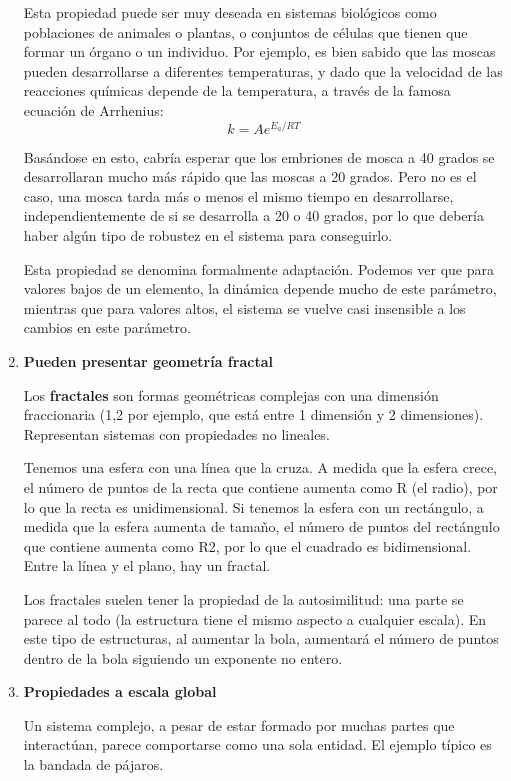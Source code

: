 \begin{enumerate}
Esta propiedad puede ser muy deseada en sistemas biológicos como poblaciones de animales o plantas, o conjuntos de células que tienen que formar un órgano o un individuo. Por ejemplo, es bien sabido que las moscas pueden desarrollarse a diferentes temperaturas, y dado que la velocidad de las reacciones químicas depende de la temperatura, a través de la famosa ecuación de Arrhenius:
$$k = Ae^{E_a/RT}$$

Basándose en esto, cabría esperar que los embriones de mosca a 40 grados se desarrollaran mucho más rápido que las moscas a 20 grados. Pero no es el caso, una mosca tarda más o menos el mismo tiempo en desarrollarse, independientemente de si se desarrolla a 20 o 40 grados, por lo que debería haber algún tipo de robustez en el sistema para conseguirlo.

Esta propiedad se denomina formalmente adaptación. Podemos ver que para valores bajos de un elemento, la dinámica depende mucho de este parámetro, mientras que para valores altos, el sistema se vuelve casi insensible a los cambios en este parámetro.

\item \textbf{Pueden presentar geometría fractal}

Los \textbf{fractales} son formas geométricas complejas con una dimensión fraccionaria (1,2 por ejemplo, que está entre 1 dimensión y 2 dimensiones). Representan sistemas con propiedades no lineales.

Tenemos una esfera con una línea que la cruza. A medida que la esfera crece, el número de puntos de la recta que contiene aumenta como R (el radio), por lo que la recta es unidimensional. Si tenemos la esfera con un rectángulo, a medida que la esfera aumenta de tamaño, el número de puntos del rectángulo que contiene aumenta como R2, por lo que el cuadrado es bidimensional. Entre la línea y el plano, hay un fractal.

Los fractales suelen tener la propiedad de la autosimilitud: una parte se parece al todo (la estructura tiene el mismo aspecto a cualquier escala). En este tipo de estructuras, al aumentar la bola, aumentará el número de puntos dentro de la bola siguiendo un exponente no entero.

\item \textbf{Propiedades a escala global}

Un sistema complejo, a pesar de estar formado por muchas partes que interactúan, parece comportarse como una sola entidad. El ejemplo típico es la bandada de pájaros.


\end{enumerate}
